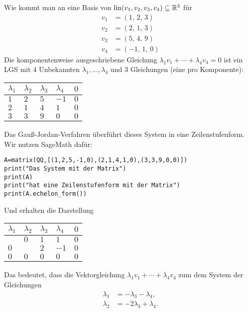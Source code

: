 \begin{bsp} Wie kommt man an eine Basis von $\operatorname{lin}(v_1,v_2,v_3,v_4) \subseteq \mathbb R^3$ für 
	\begin{align*} 
			v_1 & = \left(1,\,2,\,3\right)
			\\ v_2 & = \left(2,\,1,\,3\right)
			\\ v_3 & = \left(5,\,4,\,9\right)
			\\ v_4 & = \left(-1,\,1,\,0\right)
	\end{align*} 
	Die komponentenweise ausgeschriebene Gleichung $\lambda_1 v_1 + \cdots + \lambda_4 v_4 =0$ ist ein LGS mit $4$ Unbekannten $\lambda_1,\ldots,\lambda_4$ und $3$ Gleichungen (eine pro Komponente): 
	\begin{center} 
	\begin{tabular}{llll|l}
		$\lambda_1$ & $\lambda_2$ & $\lambda_3$ & $\lambda_4$ & $0$ 
		\\ \hline 
		$1$ & $2$ & $5$ & $-1$ & $0$
		\\ $2$ & $1$ & $4$ & $1$ & $0$
		\\ $3$ & $3$ & $9$ & $0$ & $0$
	\end{tabular} 
	\end{center} 
	Das Gauß-Jordan-Verfahren überführt dieses System in eine Zeilenstufenform. Wir nutzen SageMath dafür: 
	\begin{verbatim}
A=matrix(QQ,[(1,2,5,-1,0),(2,1,4,1,0),(3,3,9,0,0)])
print("Das System mit der Matrix")
print(A) 
print("hat eine Zeilenstufenform mit der Matrix")
print(A.echelon_form())
	\end{verbatim} 
	Und erhalten die Darstellung
	\begin{center} 
	\begin{tabular}{llll|l}
		$\lambda_1$ & $\lambda_2$ & $\lambda_3$ & $\lambda_4$ & $0$ 
		\\ \hline 
		\boxed{$1$} & $0$ & $1$ & $1$ & $0$
		\\ $0$ & \boxed{$1$} & $2$ & $-1$ & $0$
		\\ $0$ & $0$ & $0$ & $0$ & $0$
	\end{tabular} 
	\end{center} 
	Das bedeutet, dass die Vektorgleichung $\lambda_1 v_1 + \cdots + \lambda_4 v_4$ zum dem System der Gleichungen 
	\begin{align*} 
			\lambda_1 & = - \lambda_3 - \lambda_4,
		\\	\lambda_2  & = - 2\lambda_3 + \lambda_4.  
	\end{align*} 

\end{bsp}
